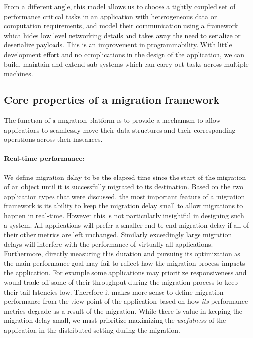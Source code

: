 From a different angle, this model allows us to choose a tightly
coupled set of performance critical tasks in an application with
heterogeneous data or computation requirements, and model their
communication using a framework which hides low level networking details
and takes away the need to serialize or deserialize payloads.
This is an improvement in programmability. With little development
effort and no complications in the design of the application,
we can build, maintain and
extend sub-systems which can carry out tasks across multiple machines.

\subsection{Core properties of a migration framework}
\label{subsec:coreprops}

The function of a migration platform is to provide a mechanism to allow
applications to seamlessly move their data structures and their
corresponding operations across their instances.

\paragraph{Real-time performance:}
We define migration delay to be the elapsed time since the start of the
migration of an object until it is successfully migrated to its
destination. Based on the two application types that were discussed,
the most
important feature of a migration framework is its ability to keep the
migration delay small to allow migrations to happen in real-time.
However this is not particularly insightful in designing such a system.
All applications will prefer a smaller end-to-end migration delay
if all of their other metrics are left unchanged. Similarly exceedingly
    large migration delays will interfere with the performance of
    virtually all applications. Furthermore, directly measuring this
    duration and pursuing its optimization as the main performance goal
    may fail to reflect how the migration process impacts the application.
    For example some applications may prioritize responsiveness and
    would trade off
    some of their throughput during the migration process to keep their
    tail latencies low.  Therefore it makes more sense to define migration
    performance from the view point of the application based on how
    \emph{its} performance metrics degrade as a result of the migration.
    While there is value in keeping the migration delay small, we must
    prioritize maximizing the \emph{usefulness} of the application in
    the distributed setting during the migration.

